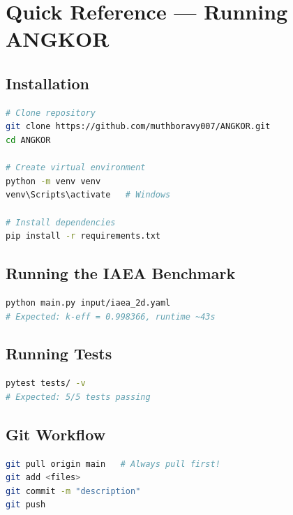\documentclass[12pt,a4paper]{article}
\begin{document}
\section{Quick Reference --- Running ANGKOR}

\subsection{Installation}

\begin{lstlisting}[language=bash, style=pythonstyle]
# Clone repository
git clone https://github.com/muthboravy007/ANGKOR.git
cd ANGKOR

# Create virtual environment
python -m venv venv
venv\Scripts\activate   # Windows

# Install dependencies
pip install -r requirements.txt
\end{lstlisting}

\subsection{Running the IAEA Benchmark}

\begin{lstlisting}[language=bash, style=pythonstyle]
python main.py input/iaea_2d.yaml
# Expected: k-eff = 0.998366, runtime ~43s
\end{lstlisting}

\subsection{Running Tests}

\begin{lstlisting}[language=bash, style=pythonstyle]
pytest tests/ -v
# Expected: 5/5 tests passing
\end{lstlisting}

\subsection{Git Workflow}

\begin{lstlisting}[language=bash, style=pythonstyle]
git pull origin main   # Always pull first!
git add <files>
git commit -m "description"
git push
\end{lstlisting}
\end{document}
